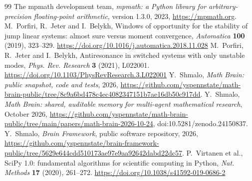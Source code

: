 \documentclass[11pt]{amsart}
\begin{document}
\begin{thebibliography}{99}
 The mpmath development team, \emph{mpmath: a Python library for arbitrary-precision floating-point arithmetic},
version 1.3.0, 2023, \url{https://mpmath.org}.
 M.~Porfiri, R.~Jeter and I.~Belykh, Windows of opportunity for the stability of jump linear systems:
almost sure versus moment convergence, \emph{Automatica} \textbf{100} (2019), 323--329.
\url{https://doi.org/10.1016/j.automatica.2018.11.028}
 M.~Porfiri, R.~Jeter and I.~Belykh, Antiresonance in switched systems with only unstable modes,
\emph{Phys. Rev. Research} \textbf{3} (2021), L022001.
\url{https://doi.org/10.1103/PhysRevResearch.3.L022001}
 Y.~Shmalo, \emph{Math Brain: public snapshot, code and tests}, 2026,
\url{https://github.com/yspennstate/math-brain-public/tree/8c9a6bd478c4ec4082347151b7ae16db50c917dd}.
 Y.~Shmalo, \emph{Math Brain: shared, auditable memory for multi-agent mathematical research},
October 2026, \url{https://github.com/yspennstate/math-brain-public/tree/main/papers/math-brain-2026-10-24},
doi:10.5281/zenodo.24150837.
 Y.~Shmalo, \emph{Brain Framework}, public software repository, 2026,
\url{https://github.com/yspennstate/brain-framework-public/tree/5629e644cdd510173ae97e9aa92642dabd22dc57}.
 P.~Virtanen et al., SciPy 1.0: fundamental algorithms for scientific computing in Python, \emph{Nat.
Methods} \textbf{17} (2020), 261--272.
\url{https://doi.org/10.1038/s41592-019-0686-2}
\end{thebibliography}

\appendix
\end{document}
